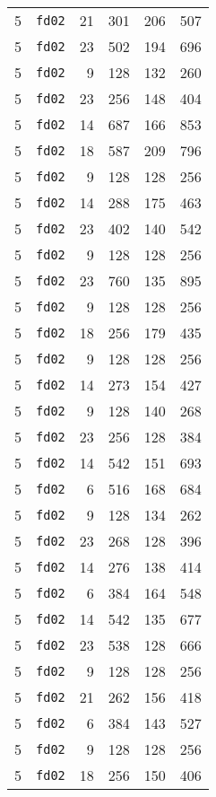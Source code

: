 \documentclass{article}
\begin{document}
\begin{table}[h!]
\begin{tabular}{llrrrl}
    5 & \texttt{fd02} & 21 & 301 & 206 & 507 \\
    5 & \texttt{fd02} & 23 & 502 & 194 & 696 \\
    5 & \texttt{fd02} & 9 & 128 & 132 & 260 \\
    5 & \texttt{fd02} & 23 & 256 & 148 & 404 \\
    5 & \texttt{fd02} & 14 & 687 & 166 & 853 \\
    5 & \texttt{fd02} & 18 & 587 & 209 & 796 \\
    5 & \texttt{fd02} & 9 & 128 & 128 & 256 \\
    5 & \texttt{fd02} & 14 & 288 & 175 & 463 \\
    5 & \texttt{fd02} & 23 & 402 & 140 & 542 \\
    5 & \texttt{fd02} & 9 & 128 & 128 & 256 \\
    5 & \texttt{fd02} & 23 & 760 & 135 & 895 \\
    5 & \texttt{fd02} & 9 & 128 & 128 & 256 \\
    5 & \texttt{fd02} & 18 & 256 & 179 & 435 \\
    5 & \texttt{fd02} & 9 & 128 & 128 & 256 \\
    5 & \texttt{fd02} & 14 & 273 & 154 & 427 \\
    5 & \texttt{fd02} & 9 & 128 & 140 & 268 \\
    5 & \texttt{fd02} & 23 & 256 & 128 & 384 \\
    5 & \texttt{fd02} & 14 & 542 & 151 & 693 \\
    5 & \texttt{fd02} & 6 & 516 & 168 & 684 \\
    5 & \texttt{fd02} & 9 & 128 & 134 & 262 \\
    5 & \texttt{fd02} & 23 & 268 & 128 & 396 \\
    5 & \texttt{fd02} & 14 & 276 & 138 & 414 \\
    5 & \texttt{fd02} & 6 & 384 & 164 & 548 \\
    5 & \texttt{fd02} & 14 & 542 & 135 & 677 \\
    5 & \texttt{fd02} & 23 & 538 & 128 & 666 \\
    5 & \texttt{fd02} & 9 & 128 & 128 & 256 \\
    5 & \texttt{fd02} & 21 & 262 & 156 & 418 \\
    5 & \texttt{fd02} & 6 & 384 & 143 & 527 \\
    5 & \texttt{fd02} & 9 & 128 & 128 & 256 \\
    5 & \texttt{fd02} & 18 & 256 & 150 & 406 \\

\end{tabular}
\end{table}
\end{document}
